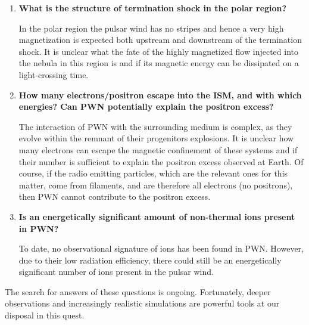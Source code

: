 \begin{enumerate}
\item \textbf{What is the structure of termination shock in the polar region? }

In the polar region the pulsar wind has no stripes and hence a very high magnetization is expected both upstream and downstream of the termination shock. It is unclear what the fate of the highly magnetized flow injected into the nebula in this region is and if its magnetic energy can be dissipated on a light-crossing time.

\item \textbf{How many electrons/positron escape into the ISM, and with which energies? Can PWN potentially explain the positron excess?}

The interaction of PWN with the surrounding medium is complex, as they evolve within the remnant of their progenitors explosions. It is unclear how many electrons can escape the magnetic confinement of these systems and if their number is sufficient to explain the positron excess observed at Earth. Of course, if the radio emitting particles, which are the relevant ones for this matter, come from filaments, and are therefore all electrons (no positrons), then PWN cannot contribute to the positron excess. 

\item \textbf{Is an energetically significant amount of non-thermal ions present in PWN?}

To date, no observational signature of ions has been found in PWN. However, due to their low radiation efficiency, there could still be an energetically significant number of ions present in the pulsar wind.

\end{enumerate}

The search for answers of these questions is ongoing. Fortunately, deeper observations and increasingly realistic simulations are powerful tools at our disposal in this quest.

